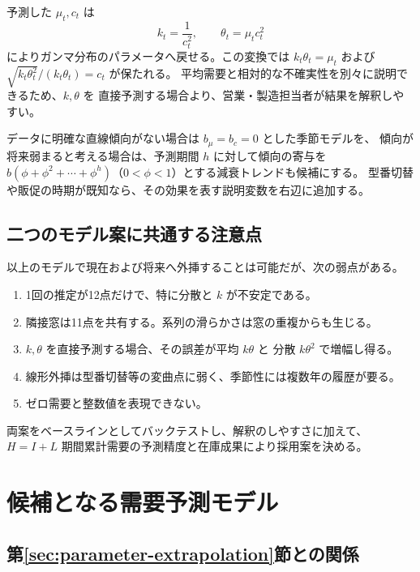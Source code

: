 \documentclass[a4paper,11pt]{jsarticle}
\begin{document}
予測した $\mu_t,c_t$ は
\[
k_t=\frac{1}{c_t^2},\qquad
\theta_t=\mu_tc_t^2
\]
によりガンマ分布のパラメータへ戻せる。この変換では
$k_t\theta_t=\mu_t$ および
$\sqrt{k_t\theta_t^2}/(k_t\theta_t)=c_t$ が保たれる。
平均需要と相対的な不確実性を別々に説明できるため、$k,\theta$ を
直接予測する場合より、営業・製造担当者が結果を解釈しやすい。

データに明確な直線傾向がない場合は $b_\mu=b_c=0$ とした季節モデルを、
傾向が将来弱まると考える場合は、予測期間 $h$ に対して傾向の寄与を
$b(\phi+\phi^2+\cdots+\phi^h)$（$0<\phi<1$）とする減衰トレンドも候補にする。
型番切替や販促の時期が既知なら、その効果を表す説明変数を右辺に追加する。

\subsection{二つのモデル案に共通する注意点}

以上のモデルで現在および将来へ外挿することは可能だが、次の弱点がある。
\begin{enumerate}
\item 1回の推定が12点だけで、特に分散と $k$ が不安定である。
\item 隣接窓は11点を共有する。系列の滑らかさは窓の重複からも生じる。
\item $k,\theta$ を直接予測する場合、その誤差が平均 $k\theta$ と
分散 $k\theta^2$ で増幅し得る。
\item 線形外挿は型番切替等の変曲点に弱く、季節性には複数年の履歴が要る。
\item ゼロ需要と整数値を表現できない。
\end{enumerate}
両案をベースラインとしてバックテストし、解釈のしやすさに加えて、
$H=I+L$ 期間累計需要の予測精度と在庫成果により採用案を決める。

\section{候補となる需要予測モデル}
\label{sec:recommended-models}

\subsection{第\ref{sec:parameter-extrapolation}節との関係}
\end{document}
